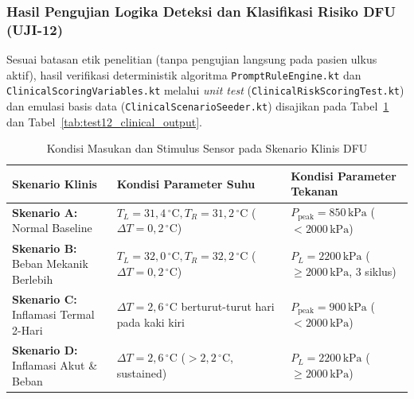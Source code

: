 \subsubsection{Hasil Pengujian Logika Deteksi dan Klasifikasi Risiko DFU (UJI-12)}
Sesuai batasan etik penelitian (tanpa pengujian langsung pada pasien ulkus aktif), hasil verifikasi deterministik algoritma \texttt{PromptRuleEngine.kt} dan \texttt{ClinicalScoringVariables.kt} melalui \textit{unit test} (\texttt{ClinicalRiskScoringTest.kt}) dan emulasi basis data (\texttt{ClinicalScenarioSeeder.kt}) disajikan pada Tabel~\ref{tab:test12_clinical_input} dan Tabel~\ref{tab:test12_clinical_output}.

\begin{table}[htbp]
\centering
\caption{Kondisi Masukan dan Stimulus Sensor pada Skenario Klinis DFU}
\label{tab:test12_clinical_input}
\small
\setlength{\tabcolsep}{6pt}
\begin{tabular}{|p{3.2cm}|p{4.6cm}|p{4.5cm}|}
\hline
\textbf{Skenario Klinis} & \textbf{Kondisi Parameter Suhu} & \textbf{Kondisi Parameter Tekanan} \\ \hline
\textbf{Skenario A:} \newline Normal Baseline & $T_L=31{,}4\,^\circ\mathrm{C}, T_R=31{,}2\,^\circ\mathrm{C}$ \newline ($\Delta T = 0{,}2\,^\circ\mathrm{C}$) & $P_{\mathrm{peak}} = 850\,\mathrm{kPa}$ ($< 2000\,\mathrm{kPa}$) \\ \hline
\textbf{Skenario B:} \newline Beban Mekanik Berlebih & $T_L=32{,}0\,^\circ\mathrm{C}, T_R=32{,}2\,^\circ\mathrm{C}$ \newline ($\Delta T = 0{,}2\,^\circ\mathrm{C}$) & $P_L = 2200\,\mathrm{kPa}$ ($\ge 2000\,\mathrm{kPa}$, 3 siklus) \\ \hline
\textbf{Skenario C:} \newline Inflamasi Termal 2-Hari & $\Delta T = 2{,}6\,^\circ\mathrm{C}$ berturut-turut \newline 2 hari pada kaki kiri & $P_{\mathrm{peak}} = 900\,\mathrm{kPa}$ ($< 2000\,\mathrm{kPa}$) \\ \hline
\textbf{Skenario D:} \newline Inflamasi Akut \& Beban & $\Delta T = 2{,}6\,^\circ\mathrm{C}$ ($> 2{,}2\,^\circ\mathrm{C}$, sustained) & $P_L = 2200\,\mathrm{kPa}$ ($\ge 2000\,\mathrm{kPa}$) \\ \hline
\end{tabular}
\end{table}

